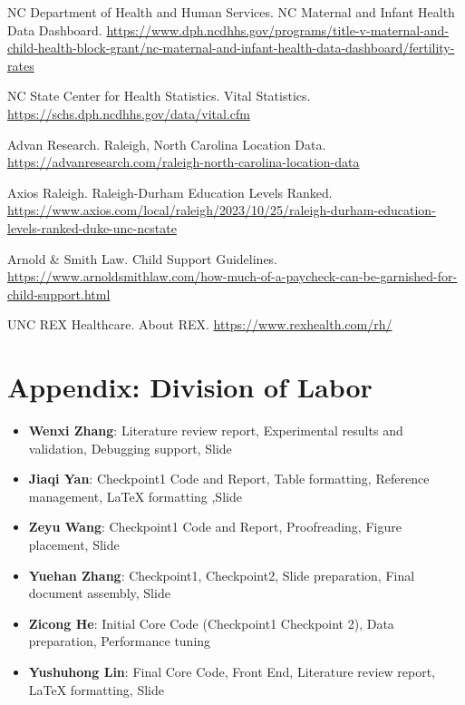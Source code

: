 \documentclass[12pt]{article}
\begin{document}
\begin{thebibliography}{20}
NC Department of Health and Human Services. NC Maternal and Infant Health Data Dashboard. \url{https://www.dph.ncdhhs.gov/programs/title-v-maternal-and-child-health-block-grant/nc-maternal-and-infant-health-data-dashboard/fertility-rates}

NC State Center for Health Statistics. Vital Statistics. \url{https://schs.dph.ncdhhs.gov/data/vital.cfm}

Advan Research. Raleigh, North Carolina Location Data. \url{https://advanresearch.com/raleigh-north-carolina-location-data}

Axios Raleigh. Raleigh-Durham Education Levels Ranked. \url{https://www.axios.com/local/raleigh/2023/10/25/raleigh-durham-education-levels-ranked-duke-unc-ncstate}

Arnold \& Smith Law. Child Support Guidelines. \url{https://www.arnoldsmithlaw.com/how-much-of-a-paycheck-can-be-garnished-for-child-support.html}

UNC REX Healthcare. About REX. \url{https://www.rexhealth.com/rh/}


\end{thebibliography}


\newpage
\section*{Appendix: Division of Labor}

\begin{itemize}
    \item \textbf{Wenxi Zhang}: Literature review report, Experimental results and validation, Debugging support, Slide
    \item \textbf{Jiaqi Yan}: Checkpoint1 Code and Report, Table formatting, Reference management, LaTeX formatting ,Slide
    \item \textbf{Zeyu Wang}: Checkpoint1 Code and Report, Proofreading, Figure placement, Slide
    \item \textbf{Yuehan Zhang}: Checkpoint1, Checkpoint2, Slide preparation, Final document assembly, Slide
    \item \textbf{Zicong He}: Initial Core Code (Checkpoint1  Checkpoint 2), Data preparation, Performance tuning
    \item \textbf{Yushuhong Lin}: Final Core Code, Front End, Literature review report, LaTeX formatting, Slide
\end{itemize}
\end{document}

